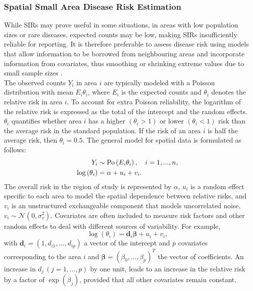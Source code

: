 \subsubsection{Spatial Small Area Disease Risk Estimation}
While SIRs may prove useful in some situations, in areas with low population sizes or rare diseases, expected counts may be low, making SIRs insufficiently reliable for reporting. It is therefore preferable to assess disease risk using models that allow information to be borrowed from neighbouring areas and incorporate information from covariates, thus smoothing or shrinking extreme values due to small sample sizes \autocite[][]{gelfand2010handbook}. \\
The observed counts $Y_i$ in area $i$ are typically modeled with a Poisson distribution with mean $E_i\theta_i$, where $E_i$ is the expected counts and $\theta_i$ denotes the relative risk in area $i$. To account for extra Poisson reliability, the logarithm of the relative risk is expressed as the total of the intercept and the random effects. $\theta_i$ quantifies whether area $i$ has a higher $\left(\theta_i >1\right)$ or lower $\left(\theta_i <1\right)$ risk than the average risk in the standard population. If the risk of an area $i$ is half the average risk, then $\theta_i = 0.5$. The general model for spatial data is formulated as follows:
\begin{align}
    Y_i&\sim\hbox{Po}\left(E_i\theta_i\right), \hspace{10pt} i=1,...,n,\\
    \log\left(\theta_i\right)&=\alpha+u_i+v_i.
\end{align}
The overall risk in the region of study is represented by $\alpha$, $u_i$ is a random effect specific to each area to model the spatial dependence between relative risks, and $v_i$ is an unstructured exchangeable component that models uncorrelated noise, $v_i\sim\mathcal{N}\left(0,\sigma_v^2\right)$. Covariates are often included to measure risk factors and other random effects to deal with different sources of variability. For example,
\begin{equation*}
    \log\left(\theta_i\right)=\pmb{d}_i\pmb{\beta}+u_i+v_i,
\end{equation*}
with $\pmb{d}_i = \left(1,d_{i1},...,d_{ip}\right)$ a vector of the intercept and $p$ covariates corresponding to the area $i$ and $\pmb{\beta}=\left(\beta_0,...,\beta_p\right)^T$ the vector of coefficients. An increase in $d_j\,\left(j = 1,...,p\right)$ by one unit, leads to an increase in the relative risk by a factor of $\exp\left(\beta_j\right)$, provided that all other covariates remain constant. \\
